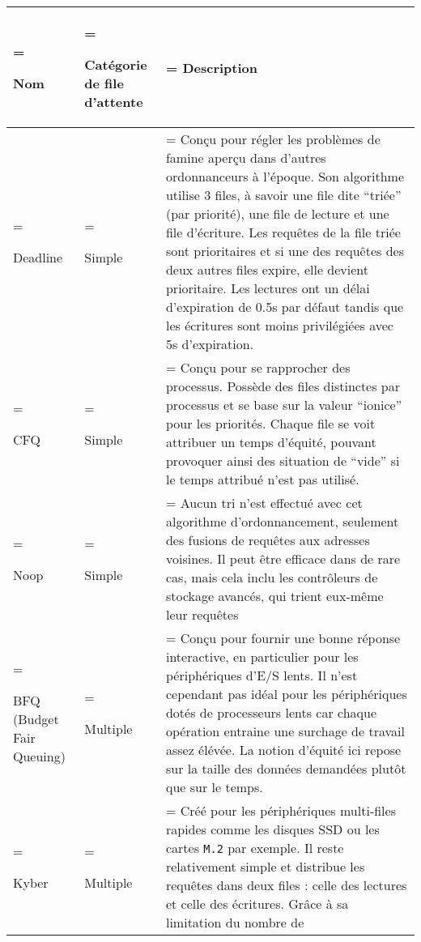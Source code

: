 \begin{center}
    \begin{tabularx}{\textwidth} { 
        | >{\hsize=0.22\hsize\linewidth=\hsize\raggedright\arraybackslash}X 
        | >{\hsize=0.23\hsize\linewidth=\hsize\raggedright\arraybackslash}X 
        | >{\hsize=1.55\hsize\linewidth=\hsize\arraybackslash}X | }
        \hline
        Nom & Catégorie de file d'attente & Description \\
        \hline
        \hline
        Deadline & Simple & Conçu pour régler les problèmes de famine aperçu 
        dans d'autres ordonnanceurs à l'époque. Son algorithme utilise 3 files, 
        à savoir une file dite ``triée'' (par priorité), une file de lecture et 
        une file d'écriture. Les requêtes de la file triée sont prioritaires et 
        si une des requêtes des deux autres files expire, elle devient 
        prioritaire. Les lectures ont un délai d'expiration de 0.5s par défaut 
        tandis que les écritures sont moins privilégiées avec 5s d'expiration. 
        \\
        \hline
        CFQ & Simple & Conçu pour se rapprocher des processus. Possède des 
        files distinctes par processus et se base sur la valeur ``ionice'' pour 
        les priorités. Chaque file se voit attribuer un temps d'équité, pouvant 
        provoquer ainsi des situation de ``vide'' si le temps attribué n'est 
        pas utilisé. \\
        \hline
        Noop & Simple & Aucun tri n'est effectué avec cet algorithme 
        d'ordonnancement, seulement des fusions de requêtes aux adresses 
        voisines. Il peut être efficace dans de rare cas, mais cela inclu les 
        contrôleurs de stockage avancés, qui trient eux-même leur requêtes \\
        \hline
        BFQ (Budget Fair Queuing) & Multiple & Conçu pour fournir une bonne 
        réponse interactive, en particulier pour les périphériques d'E/S lents. 
        Il n'est cependant pas idéal pour les périphériques dotés de 
        processeurs lents car chaque opération entraine une surchage de travail 
        assez élévée. La notion d'équité ici repose sur la taille des données 
        demandées plutôt que sur le temps. \\
        \hline
        Kyber & Multiple & Créé pour les périphériques multi-files rapides 
        comme les disques SSD ou les cartes \texttt{M.2} par exemple. Il reste 
        relativement simple et distribue les requêtes dans deux files : celle 
        des lectures et celle des écritures. Grâce à sa limitation du nombre de 

\end{tabularx}
\end{center}
